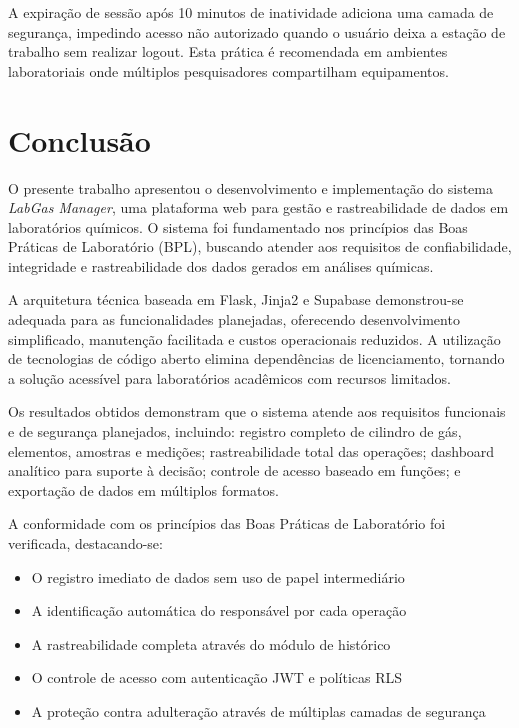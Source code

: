 \documentclass[12pt,a4paper]{article}
\providecommand\关键字[1]{\textbf{#1}}
\begin{document}
A expiração de sessão após 10 minutos de inatividade adiciona uma camada de segurança, impedindo acesso não autorizado quando o usuário deixa a estação de trabalho sem realizar logout. Esta prática é recomendada em ambientes laboratoriais onde múltiplos pesquisadores compartilham equipamentos.

\section{Conclusão}

O presente trabalho apresentou o desenvolvimento e implementação do sistema \textit{LabGas Manager}, uma plataforma web para gestão e rastreabilidade de dados em laboratórios químicos. O sistema foi fundamentado nos princípios das Boas Práticas de Laboratório (BPL), buscando atender aos requisitos de confiabilidade, integridade e rastreabilidade dos dados gerados em análises químicas.

A arquitetura técnica baseada em Flask, Jinja2 e Supabase demonstrou-se adequada para as funcionalidades planejadas, oferecendo desenvolvimento simplificado, manutenção facilitada e custos operacionais reduzidos. A utilização de tecnologias de código aberto elimina dependências de licenciamento, tornando a solução acessível para laboratórios acadêmicos com recursos limitados.

Os resultados obtidos demonstram que o sistema atende aos requisitos funcionais e de segurança planejados, incluindo: registro completo de cilindro de gás, elementos, amostras e medições; rastreabilidade total das operações; dashboard analítico para suporte à decisão; controle de acesso baseado em funções; e exportação de dados em múltiplos formatos.

A conformidade com os princípios das Boas Práticas de Laboratório foi verificada, destacando-se:

\begin{itemize}
\item O registro imediato de dados sem uso de papel intermediário
\item A identificação automática do responsável por cada operação
\item A rastreabilidade completa através do módulo de histórico
\item O controle de acesso com autenticação JWT e políticas RLS
\item A proteção contra adulteração através de múltiplas camadas de segurança
\end{itemize}
\end{document}
